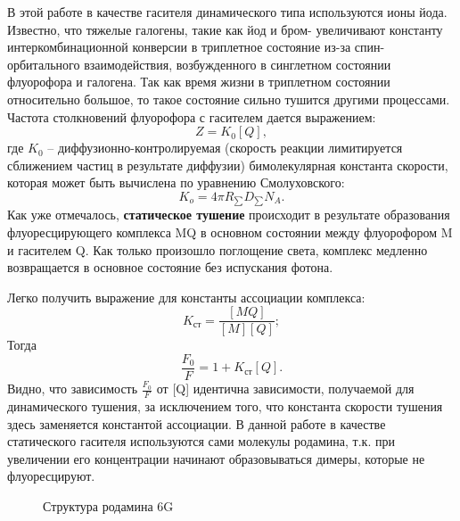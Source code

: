 \documentclass[a4paper,12pt]{article}
\begin{document}
В этой работе в качестве гасителя динамического типа используются ионы йода.
Известно, что тяжелые галогены, такие как йод и бром- увеличивают константу
интеркомбинационной конверсии в триплетное состояние из-за спин-орбитального
взаимодействия, возбужденного в синглетном состоянии флуорофора и галогена. Так как
время жизни в триплетном состоянии относительно большое, то такое состояние сильно
тушится другими процессами.
Частота столкновений флуорофора с гасителем дается выражением:
\begin{equation}
    Z = K_0 [Q],
\end{equation}
где $K_0$ – диффузионно-контролируемая (скорость реакции лимитируется сближением частиц
в результате диффузии) бимолекулярная константа скорости, которая может быть
вычислена по уравнению Смолуховского:
\begin{equation}
   K_o = 4 \pi R_{\sum} D_{\sum} N_A.
\end{equation}
Как уже отмечалось, \textbf{статическое тушение} происходит в результате образования
флуоресцирующего комплекса MQ в основном состоянии между флуорофором M и
гасителем Q. Как только произошло поглощение света, комплекс медленно
возвращается в основное состояние без испускания фотона.

Легко получить выражение для константы ассоциации комплекса:
\begin{equation}
    K_\text{ст} = \frac{[MQ]}{[M][Q]};
\end{equation}
Тогда 
\begin{equation}
    \frac{F_0}{F} = 1 + K_\text{ст}[Q].
\end{equation}
Видно, что зависимость $\frac{F_0}{F}$ от [Q] идентична зависимости, получаемой для
динамического тушения, за исключением того, что константа скорости тушения здесь
заменяется константой ассоциации.
В данной работе в качестве статического гасителя используются сами молекулы
родамина, т.к. при увеличении его концентрации начинают образовываться димеры, которые
не флуоресцируют.

\begin{figure}[h!]
\caption{Структура родамина 6G}
\end{figure}
\end{document}
